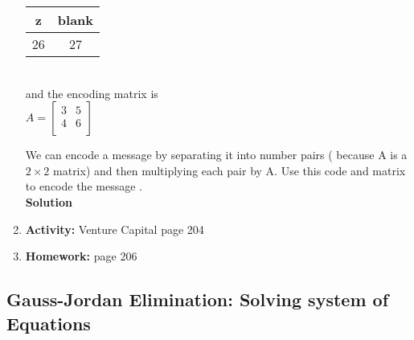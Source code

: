 \documentclass[12pt]{amsart}
\begin{document}
\begin{enumerate}
\begin{tabular}{|c|c|}
\hline
z & blank \\
\hline
26 & 27 \\
\hline
\end{tabular} \\
and the encoding matrix is \\
$A = \begin{bmatrix}
		3 & 5  \\
		4 & 6 \\
\end{bmatrix}$

We can encode a message by separating it into number pairs ( because A is a $2 \times 2$ matrix) and then multiplying each pair by A. Use this code and matrix to encode the message .\\

\textbf{Solution}

\vspace{4in}

\item \textbf{Activity:} Venture Capital page 204\\


\item \textbf{Homework:} page 206\\
\end{enumerate}



\newpage
\subsection{Gauss-Jordan Elimination: Solving system of Equations}
\end{document}
